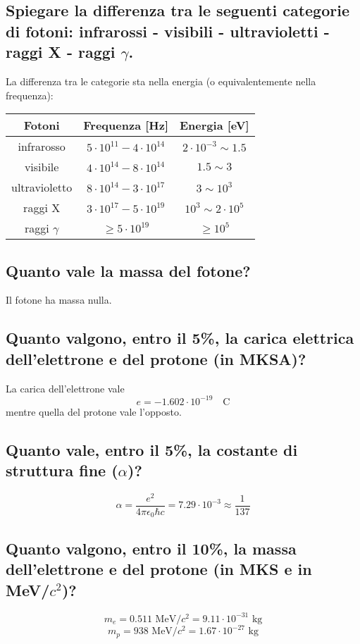 \subsection[]{Spiegare la differenza tra le seguenti categorie di fotoni: infrarossi - visibili - ultravioletti - raggi X - raggi $\gamma$. } 
La differenza tra le categorie sta nella energia (o equivalentemente nella frequenza):
\begin{table}[H]
	\centering
	\label{tab: fotoni}
	\begin{tabular}{ccc}
		Fotoni & Frequenza [Hz] & Energia [eV] \\
		\hline
		infrarosso & $5 \cdot 10^{11} - 4 \cdot 10^{14}$ & $2 \cdot 10^{-3} \sim 1.5$  \\
		visibile & $4 \cdot 10^{14} - 8 \cdot 10^{14}$ & $1.5 \sim  3$ \\
		ultravioletto & $8 \cdot 10^{14} - 3 \cdot 10^{17}$ & $3 \sim 10^3$ \\
		raggi X & $3 \cdot 10^{17} - 5 \cdot 10^{19}$ & $ 10^3 \sim 2 \cdot 10^{5} $ \\
		raggi $\gamma$ & $\ge 5 \cdot 10^{19}$ & $\ge 10^5$
	\end{tabular}
\end{table}

\subsection[]{ Quanto vale la massa del fotone?}
Il fotone ha massa nulla.
\subsection[]{ Quanto valgono, entro il 5\%, la carica elettrica dell’elettrone e del protone (in MKSA)?}
La carica dell'elettrone vale 
\[
	e = -1.602 \cdot 10^{-19} \quad \text{C}
\]
 mentre quella del protone vale l'opposto. 

\subsection[]{ Quanto vale, entro il 5\%, la costante di struttura fine ($\alpha$)?}
\[
	\alpha = \frac{e^{2}}{4\pi \epsilon_0 \hbar c} = 7.29 \cdot 10^{-3} \approx \frac{1}{137}
\] 	
\subsection[]{ Quanto valgono, entro il 10\%, la massa dell’elettrone e del protone (in MKS e in MeV/$c^2$)?}
\[
m_{e} = 0.511 \text{ MeV/$c^{2}$} = 9.11 \cdot 10^{-31} \text{ kg}
\] 
\[
m_{p} = 938 \text{ MeV/$c^{2}$} = 1.67 \cdot 10^{-27} \text{ kg}
\] 
